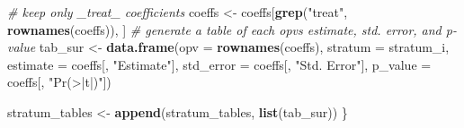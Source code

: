 \documentclass[
]{article}
\newenvironment{Shaded}{\begin{snugshade}}{\end{snugshade}}
\newcommand{\AttributeTok}[1]{\textcolor[rgb]{0.13,0.29,0.53}{#1}}
\newcommand{\CommentTok}[1]{\textcolor[rgb]{0.56,0.35,0.01}{\textit{#1}}}
\newcommand{\FunctionTok}[1]{\textcolor[rgb]{0.13,0.29,0.53}{\textbf{#1}}}
\newcommand{\NormalTok}[1]{#1}
\newcommand{\OtherTok}[1]{\textcolor[rgb]{0.56,0.35,0.01}{#1}}
\newcommand{\StringTok}[1]{\textcolor[rgb]{0.31,0.60,0.02}{#1}}
\begin{document}
\begin{enumerate}
\begin{Shaded}
\begin{Highlighting}[]
  \CommentTok{\# keep only \_treat\_ coefficients}
\NormalTok{  coeffs }\OtherTok{\textless{}{-}}\NormalTok{ coeffs[}\FunctionTok{grep}\NormalTok{(}\StringTok{"treat"}\NormalTok{, }\FunctionTok{rownames}\NormalTok{(coeffs)), ]}
  \CommentTok{\# generate a table of each opv\textquotesingle{}s estimate, std. error, and p{-}value}
\NormalTok{  tab\_sur }\OtherTok{\textless{}{-}} \FunctionTok{data.frame}\NormalTok{(}\AttributeTok{opv =} \FunctionTok{rownames}\NormalTok{(coeffs),}
                        \AttributeTok{stratum =}\NormalTok{ stratum\_i,}
                        \AttributeTok{estimate =}\NormalTok{ coeffs[, }\StringTok{"Estimate"}\NormalTok{], }
                        \AttributeTok{std\_error =}\NormalTok{ coeffs[, }\StringTok{"Std. Error"}\NormalTok{], }
                        \AttributeTok{p\_value =}\NormalTok{ coeffs[, }\StringTok{"Pr(\textgreater{}|t|)"}\NormalTok{])}

\NormalTok{  stratum\_tables }\OtherTok{\textless{}{-}} \FunctionTok{append}\NormalTok{(stratum\_tables, }\FunctionTok{list}\NormalTok{(tab\_sur))}
\NormalTok{\}}
\end{Highlighting}
\end{Shaded}


\end{enumerate}
\end{document}
